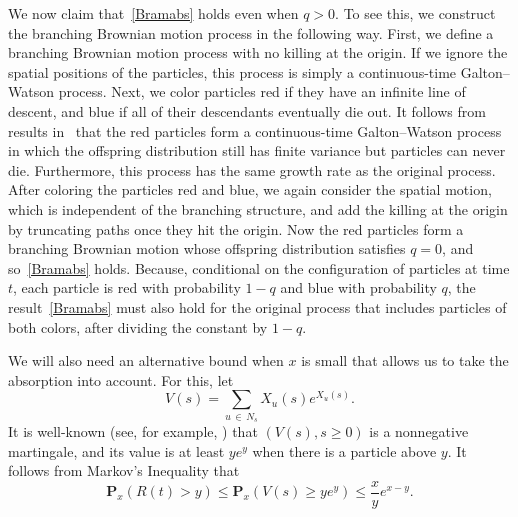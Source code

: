 \documentclass[AHL,Unicode,longabstracts,published]{cedram}
\renewcommand*\P{\mathbf{P}}
\newcommand{\1} {\mathds{1}}
\begin{document}
We now claim that~\eqref{Bramabs} holds even when $q > 0$. To see this, we construct the branching Brownian motion process in the following way. First, we define a branching Brownian motion process with no killing at the origin. If we ignore the spatial positions of the particles, this process is simply a continuous-time Galton--Watson process. Next, we color particles red if they have an infinite line of descent, and blue if all of their descendants eventually die out. It follows from results in~\cite{gr} that the red particles form a continuous-time Galton--Watson process in which the offspring distribution still has finite variance but particles can never die. Furthermore, this process has the same growth rate as the original process. After coloring the particles red and blue, we again consider the spatial motion, which is independent of the branching structure, and add the killing at the origin by truncating paths once they hit the origin. Now the red particles form a branching Brownian motion whose offspring distribution satisfies $q = 0$, and so~\eqref{Bramabs} holds. Because, conditional on the configuration of particles at time $t$, each particle is red with probability $1-q$ and blue with probability $q$, the result~\eqref{Bramabs} must also hold for the original process that includes particles of both colors, after dividing the constant by $1 - q$.

We will also need an alternative bound when $x$ is small that allows us to take the absorption into account. For this, let
\[
V(s) = \sum_{u\,\in\,N_s} X_u(s) e^{X_u(s)}.
\]
It is well-known (see, for example, \cite[Lemma~2]{hh07}) that $(V(s), s \geq 0)$ is a nonnegative martingale, and its value is at least $ye^y$ when there is a particle above $y$. It follows from Markov's Inequality that
\begin{equation}\label{derMG}
\P_x(R(t) > y) \leq \P_x\left(V(s) \ge ye^y\right) \leq \frac{x}{y} e^{x - y}.
\end{equation}
\end{document}
